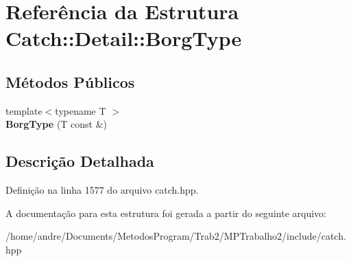 \hypertarget{structCatch_1_1Detail_1_1BorgType}{}\section{Referência da Estrutura Catch\+:\+:Detail\+:\+:Borg\+Type}
\label{structCatch_1_1Detail_1_1BorgType}
\subsection*{Métodos Públicos}
\begin{DoxyCompactItemize}
\item 
{\footnotesize template$<$typename T $>$ }\\{\bfseries Borg\+Type} (T const \&)\hypertarget{structCatch_1_1Detail_1_1BorgType_a780a9946ed0d654f0bfc043c8fc505d8}{}\label{structCatch_1_1Detail_1_1BorgType_a780a9946ed0d654f0bfc043c8fc505d8}

\end{DoxyCompactItemize}


\subsection{Descrição Detalhada}


Definição na linha 1577 do arquivo catch.\+hpp.



A documentação para esta estrutura foi gerada a partir do seguinte arquivo\+:\begin{DoxyCompactItemize}
\item 
/home/andre/\+Documents/\+Metodos\+Program/\+Trab2/\+M\+P\+Trabalho2/include/catch.\+hpp\end{DoxyCompactItemize}
